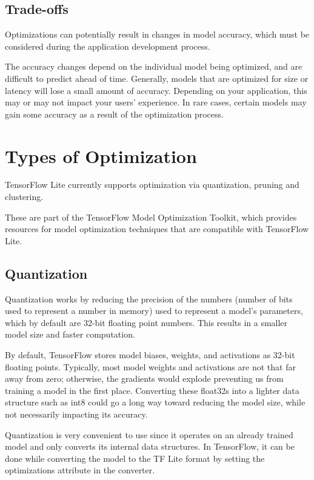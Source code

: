 \subsection{Trade-offs}
Optimizations can potentially result in changes in model accuracy, which must be considered during the application development process.

The accuracy changes depend on the individual model being optimized, and are difficult to predict ahead of time. Generally, models that are optimized for size or latency will lose a small amount of accuracy. Depending on your application, this may or may not impact your users' experience. In rare cases, certain models may gain some accuracy as a result of the optimization process. \cite{tfl_Opt:2024}

\section{Types of Optimization}
TensorFlow Lite currently supports optimization via quantization, pruning and clustering.

These are part of the TensorFlow Model Optimization Toolkit, which provides resources for model optimization techniques that are compatible with TensorFlow Lite.

\subsection{Quantization}
Quantization works by reducing the precision of the numbers (number of bits used to represent a number in memory) used to represent a model's parameters, which by default are 32-bit floating point numbers. This results in a smaller model size and faster computation. \cite{tfl_Opt:2024}

By default, TensorFlow stores model biases, weights, and activations as 32-bit floating points. Typically, most model weights and activations are not that far away from zero; otherwise, the gradients would explode preventing us from training a model in the first place. Converting these float32s into a lighter data structure such as int8 could go a long way toward reducing the model size, while not necessarily impacting its accuracy.

Quantization is very convenient to use since it operates on an already trained model and only converts its internal data structures. In TensorFlow, it can be done while converting the model to the TF Lite format by setting the optimizations attribute in the converter. \cite{datascienceModelOptimization:2024}

